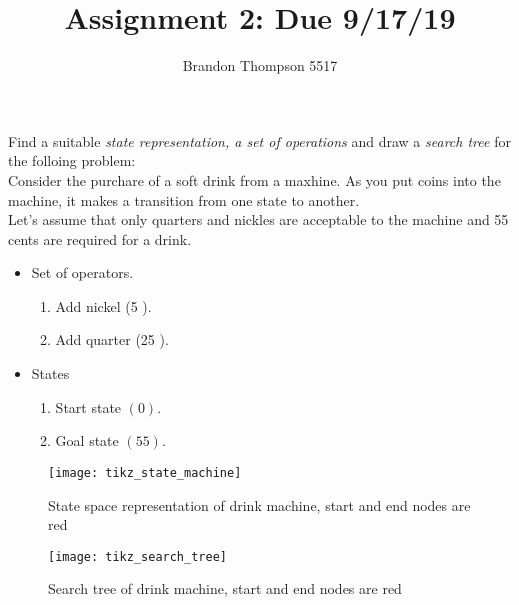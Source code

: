 \documentclass[a4paper]{article}
\begin{document}
	\author{Brandon Thompson 5517}
	\title{Assignment 2: Due 9/17/19}
	\maketitle

	\medskip

	Find a suitable \textit{state representation, a set of operations} and draw a
	\textit{search tree} for the folloing problem:\\

	Consider the purchare of a soft drink from a maxhine. As you put coins into the machine,
	it makes a transition from one state to another.\\
	Let's assume that only quarters and nickles are acceptable to the machine and 55 cents
	are required for a drink.

	\begin{itemize}
		\item Set of operators.
		\begin{enumerate}
			\item Add nickel (5 \textcent).
			\item Add quarter (25 \textcent).
		\end{enumerate}
		\item States
		\begin{enumerate}
			\item Start state $(0)$.
			\item Goal state  $(55)$.
		\end{enumerate}
	\end{itemize}

	\begin{figure}[ht]
		\centering
		\texttt{[image: tikz\_state\_machine]}
		\caption{State space representation of drink machine, start and end nodes are red}
		\label{fig:tikz_state_machine}
	\end{figure}
	
	\begin{figure}[ht]
		\centering
		\texttt{[image: tikz\_search\_tree]}
		\caption{Search tree of drink machine, start and end nodes are red}
		\label{fig:tikz_search_tree}
	\end{figure}

	
\end{document}
